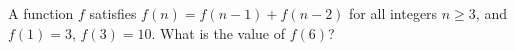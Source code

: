 A function $f$ satisfies $f(n)=f(n-1)+f(n-2)$ for all integers $n\ge3$, and $f(1)=3$, $f(3)=10$. What is the value of $f(6)$?

